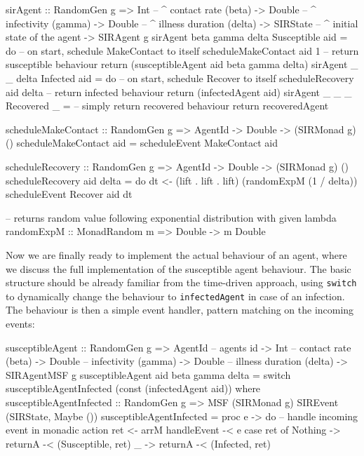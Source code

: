 \begin{HaskellCode}
sirAgent :: RandomGen g 
         => Int         -- ^ contact rate (beta)
         -> Double      -- ^ infectivity (gamma)
         -> Double      -- ^ illness duration (delta)
         -> SIRState    -- ^ initial state of the agent
         -> SIRAgent g
sirAgent beta gamma delta Susceptible aid = do
  -- on start, schedule MakeContact to itself
  scheduleMakeContact aid 1
  -- return susceptible behaviour
  return (susceptibleAgent aid beta gamma delta)
sirAgent _ _ delta Infected aid = do
  -- on start, schedule Recover to itself
  scheduleRecovery aid delta
  -- return infected behaviour
  return (infectedAgent aid)
sirAgent _ _ _ Recovered _ = 
  -- simply return recovered behaviour
  return recoveredAgent

scheduleMakeContact :: RandomGen g => AgentId -> Double -> (SIRMonad g) ()
scheduleMakeContact aid = scheduleEvent MakeContact aid

scheduleRecovery :: RandomGen g => AgentId -> Double -> (SIRMonad g) ()
scheduleRecovery aid delta = do
  dt <- (lift . lift . lift) (randomExpM (1 / delta))
  scheduleEvent Recover aid dt

-- returns random value following exponential distribution with given lambda
randomExpM :: MonadRandom m => Double -> m Double
\end{HaskellCode}

Now we are finally ready to implement the actual behaviour of an agent, where we discuss the full implementation of the susceptible agent behaviour. The basic structure should be already familiar from the time-driven approach, using \texttt{switch} to dynamically change the behaviour to \texttt{infectedAgent} in case of an infection. The behaviour is then a simple event handler, pattern matching on the incoming events:

\begin{HaskellCode}
susceptibleAgent :: RandomGen g 
                 => AgentId        -- agents id
                 -> Int            -- contact rate (beta)
                 -> Double         -- infectivity (gamma)
                 -> Double         -- illness duration (delta)
                 -> SIRAgentMSF g
susceptibleAgent aid beta gamma delta = 
    switch susceptibleAgentInfected (const (infectedAgent aid))
  where
    susceptibleAgentInfected :: RandomGen g 
                             => MSF (SIRMonad g) SIREvent (SIRState, Maybe ()) 
    susceptibleAgentInfected = proc e -> do
      -- handle incoming event in monadic action
      ret <- arrM handleEvent -< e
      case ret of
        Nothing -> returnA -< (Susceptible, ret)
        _       -> returnA -< (Infected, ret)
\end{HaskellCode}

